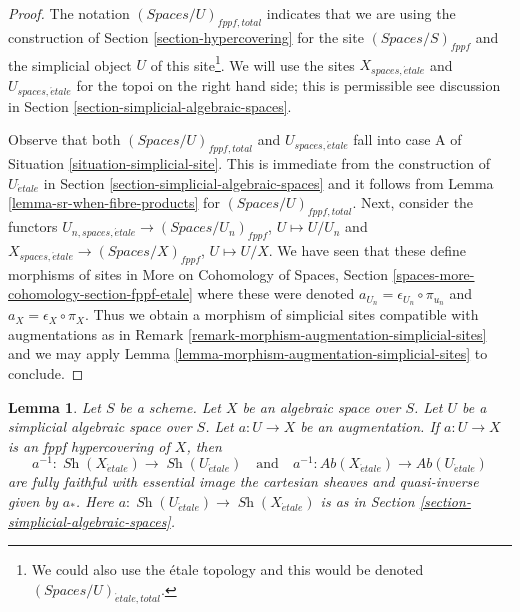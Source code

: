\documentclass{stacks-project}
\theoremstyle{plain}
\newtheorem{lemma}[subsection]{Lemma}
\theoremstyle{definition}
\theoremstyle{remark}
\numberwithin{equation}{subsection}
\def\Sh{\mathop{\mathit{Sh}}\nolimits}
\def\etale{{\acute{e}tale}}
\begin{document}
\begin{proof}
The notation $(\textit{Spaces}/U)_{fppf, total}$ indicates that
we are using the construction of
Section \ref{section-hypercovering}
for the site $(\textit{Spaces}/S)_{fppf}$ and the
simplicial object $U$ of this site\footnote{We could also
use the \'etale topology and this would be denoted
$(\textit{Spaces}/U)_{\etale, total}$.}.
We will use the sites $X_{spaces, \etale}$ and $U_{spaces, \etale}$
for the topoi on the right hand side; this is permissible
see discussion in Section \ref{section-simplicial-algebraic-spaces}.

\medskip\noindent
Observe that both $(\textit{Spaces}/U)_{fppf, total}$ and
$U_{spaces, \etale}$
fall into case A of Situation \ref{situation-simplicial-site}.
This is immediate from the construction of
$U_\etale$ in Section \ref{section-simplicial-algebraic-spaces}
and it follows from Lemma \ref{lemma-sr-when-fibre-products}
for $(\textit{Spaces}/U)_{fppf, total}$.
Next, consider the functors
$U_{n, spaces, \etale} \to (\textit{Spaces}/U_n)_{fppf}$, $U \mapsto U/U_n$
and
$X_{spaces, \etale} \to (\textit{Spaces}/X)_{fppf}$, $U \mapsto U/X$.
We have seen that these define morphisms of sites in
More on Cohomology of Spaces, Section
\ref{spaces-more-cohomology-section-fppf-etale}
where these were denoted $a_{U_n} = \epsilon_{U_n} \circ \pi_{u_n}$
and $a_X = \epsilon_X \circ \pi_X$.
Thus we obtain a morphism of simplicial sites compatible with
augmentations as in Remark \ref{remark-morphism-augmentation-simplicial-sites}
and we may apply
Lemma \ref{lemma-morphism-augmentation-simplicial-sites} to conclude.
\end{proof}

\begin{lemma}
\label{lemma-descent-sheaves-for-fppf-hypercovering}
Let $S$ be a scheme. Let $X$ be an algebraic space over $S$.
Let $U$ be a simplicial algebraic space over $S$. Let $a : U \to X$
be an augmentation. If $a : U \to X$ is an fppf hypercovering of $X$,
then
$$
a^{-1} : \Sh(X_\etale) \to \Sh(U_\etale)
\quad\text{and}\quad
a^{-1} : \textit{Ab}(X_\etale) \to \textit{Ab}(U_\etale)
$$
are fully faithful with essential image the cartesian sheaves and
quasi-inverse given by $a_*$. Here $a : \Sh(U_\etale) \to \Sh(X_\etale)$
is as in Section \ref{section-simplicial-algebraic-spaces}.
\end{lemma}
\end{document}
